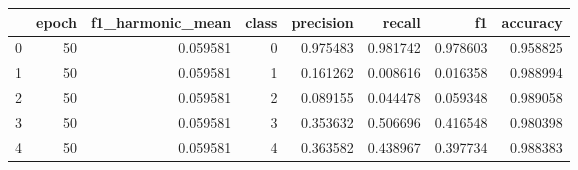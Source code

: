 \begin{tabular}{lrrrrrrr}
\toprule
 & epoch & f1_harmonic_mean & class & precision & recall & f1 & accuracy \\
\midrule
0 & 50 & 0.059581 & 0 & 0.975483 & 0.981742 & 0.978603 & 0.958825 \\
1 & 50 & 0.059581 & 1 & 0.161262 & 0.008616 & 0.016358 & 0.988994 \\
2 & 50 & 0.059581 & 2 & 0.089155 & 0.044478 & 0.059348 & 0.989058 \\
3 & 50 & 0.059581 & 3 & 0.353632 & 0.506696 & 0.416548 & 0.980398 \\
4 & 50 & 0.059581 & 4 & 0.363582 & 0.438967 & 0.397734 & 0.988383 \\
\bottomrule
\end{tabular}
